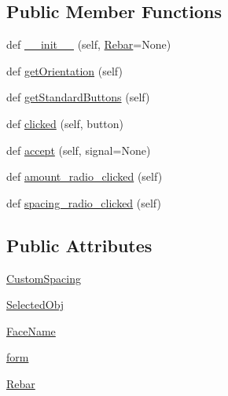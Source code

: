 \subsection*{Public Member Functions}
\begin{DoxyCompactItemize}
\item 
def \hyperlink{classUShapeRebar_1_1__UShapeRebarTaskPanel_a242486d55ca470c8e0629508ec295036}{\+\_\+\+\_\+init\+\_\+\+\_\+} (self, \hyperlink{classUShapeRebar_1_1__UShapeRebarTaskPanel_a01238597180da20c197d4c02925814f6}{Rebar}=None)
\item 
def \hyperlink{classUShapeRebar_1_1__UShapeRebarTaskPanel_a3389799920a78686a2b4e17131101db0}{get\+Orientation} (self)
\item 
def \hyperlink{classUShapeRebar_1_1__UShapeRebarTaskPanel_a38ab35540a5a1657ee9c4fa2feeae575}{get\+Standard\+Buttons} (self)
\item 
def \hyperlink{classUShapeRebar_1_1__UShapeRebarTaskPanel_a1d59169cef16d01c4d09766255188fcb}{clicked} (self, button)
\item 
def \hyperlink{classUShapeRebar_1_1__UShapeRebarTaskPanel_a9307d2a59f5d26ba7ce25b4603d78eb6}{accept} (self, signal=None)
\item 
def \hyperlink{classUShapeRebar_1_1__UShapeRebarTaskPanel_a413995e1628847d66ad62ce177242c51}{amount\+\_\+radio\+\_\+clicked} (self)
\item 
def \hyperlink{classUShapeRebar_1_1__UShapeRebarTaskPanel_a6c7a6e22e7d3f9233bf199561beb58b1}{spacing\+\_\+radio\+\_\+clicked} (self)
\end{DoxyCompactItemize}
\subsection*{Public Attributes}
\begin{DoxyCompactItemize}
\item 
\hyperlink{classUShapeRebar_1_1__UShapeRebarTaskPanel_abb7e05e650f1e52e878b0d74be1c9abd}{Custom\+Spacing}
\item 
\hyperlink{classUShapeRebar_1_1__UShapeRebarTaskPanel_a74e2f5a2b08a8ae07513d6aa8ace25c6}{Selected\+Obj}
\item 
\hyperlink{classUShapeRebar_1_1__UShapeRebarTaskPanel_abc34324a2e2e788d505002fec92ab78f}{Face\+Name}
\item 
\hyperlink{classUShapeRebar_1_1__UShapeRebarTaskPanel_a6f9058a758e84681c44f1abd37d95742}{form}
\item 
\hyperlink{classUShapeRebar_1_1__UShapeRebarTaskPanel_a01238597180da20c197d4c02925814f6}{Rebar}
\end{DoxyCompactItemize}


